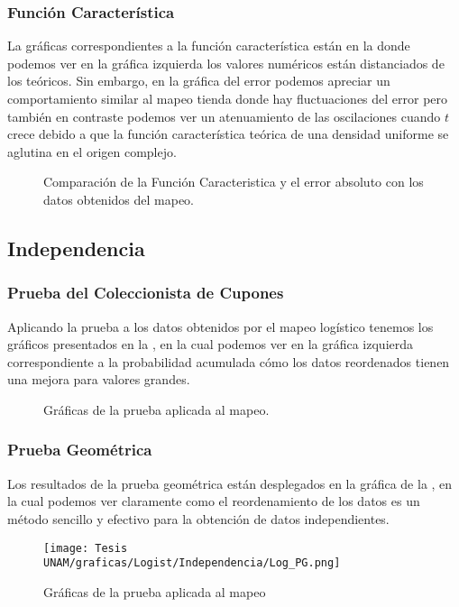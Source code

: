 \documentclass[../Main.tex]{subfiles}
\begin{document}
\subsubsection{Función Característica}

La gráficas correspondientes a la función característica están en la  donde podemos ver en la gráfica izquierda los valores numéricos están distanciados de los teóricos. Sin embargo, en la gráfica del error podemos apreciar un comportamiento similar al mapeo tienda donde hay fluctuaciones del error pero también en contraste podemos ver un atenuamiento de las oscilaciones cuando $t$ crece debido a que la función característica teórica de una densidad uniforme se aglutina en el origen complejo.

\begin{figure}[h!]
\hfill
{}
\hfill
{}
\hfill
\caption{Comparación de la Función Caracteristica y el error absoluto con los datos obtenidos del mapeo.}
\label{fig:FC_log}
\end{figure}

\subsection{Independencia}
\subsubsection{Prueba del Coleccionista de Cupones}

Aplicando la prueba a los datos obtenidos por el mapeo logístico tenemos los gráficos presentados en la , en la cual podemos ver en la gráfica izquierda correspondiente a la probabilidad acumulada cómo los datos reordenados tienen una mejora para valores grandes.
\begin{figure}[h!]
\hfill
{}
\hfill
{}
\hfill
\caption{Gráficas de la prueba aplicada al mapeo.}
\label{fig:PCC_log}
\end{figure}
\subsubsection{Prueba Geométrica}
Los resultados de la prueba geométrica están desplegados en la gráfica de la , en la cual podemos ver claramente como el reordenamiento de los datos es un método sencillo y efectivo para la obtención de datos independientes. 
\begin{figure}[h!]
    \centering
    \texttt{[image: Tesis UNAM/graficas/Logist/Independencia/Log\_PG.png]}
    \caption{Gráficas de la prueba aplicada al mapeo}
    \label{fig:PG_log}
\end{figure} 
\end{document}
